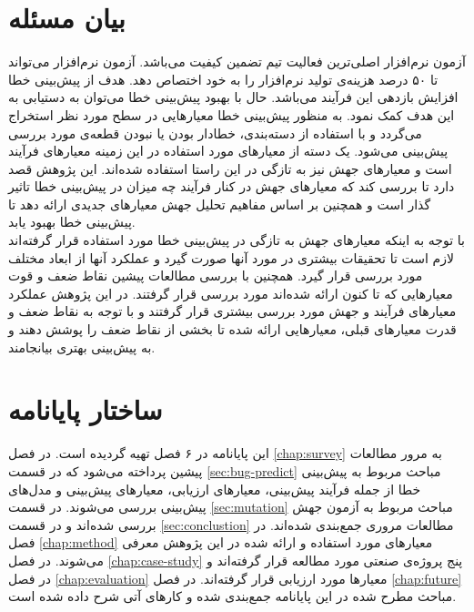 \section{بیان مسئله}
آزمون نرم‌افزار اصلی‌ترین فعالیت تیم  تضمین کیفیت می‌باشد. آزمون نرم‌افزار می‌تواند تا ۵۰ درصد هزینه‌ی تولید نرم‌افزار را به خود اختصاص دهد. هدف از پیش‌بینی خطا افزایش بازدهی این فرآیند می‌باشد. حال با بهبود پیش‌بینی خطا می‌توان به دستیابی به این هدف کمک نمود. به منظور پیش‌بینی خطا معیارهایی  در سطح مورد نظر استخراج می‌گردد و با استفاده از دسته‌بندی، خطادار بودن یا نبودن قطعه‌ی مورد بررسی پیش‌بینی می‌شود. یک دسته از معیارهای مورد استفاده در این زمینه معیارهای فرآیند است و معیارهای جهش نیز به تازگی در این راستا استفاده شده‌اند. این پژوهش قصد دارد تا بررسی کند که معیارهای جهش در کنار فرآیند  چه میزان در پیش‌بینی خطا تاثیر گذار است و همچنین بر اساس مفاهیم تحلیل جهش معیارهای جدیدی ارائه دهد تا پیش‌بینی خطا بهبود یابد. \\

با توجه به اینکه معیارهای جهش به تازگی در پیش‌بینی خطا مورد استفاده قرار گرفته‌اند لازم است تا تحقیقات بیشتری در مورد آنها صورت گیرد و عملکرد آنها از ابعاد مختلف مورد بررسی قرار گیرد. همچنین با بررسی مطالعات پیشین نقاط ضعف و قوت معیارهایی که تا کنون ارائه شده‌اند مورد بررسی قرار گرفتند. در این پژوهش عملکرد معیارهای فرآیند و جهش مورد بررسی بیشتری قرار گرفتند و با توجه به نقاط ضعف و قدرت معیارهای قبلی، معیارهایی ارائه شده تا بخشی از نقاط ضعف را پوشش دهند و به پیش‌بینی بهتری بیانجامند. 
\section{ساختار پایانامه}

این پایانامه در ۶ فصل تهیه گردیده است. در فصل \ref{chap:survey} به مرور مطالعات پیشین پرداخته می‌شود که در  قسمت \ref{sec:bug-predict}  مباحث مربوط به پیش‌بینی خطا از جمله فرآیند پیش‌بینی، معیارهای ارزیابی، معیارهای پیش‌بینی و مدل‌های پیش‌بینی بررسی می‌شوند. در قسمت \ref{sec:mutation} مباحث مربوط به آزمون جهش بررسی شده‌اند و در قسمت \ref{sec:conclustion} مطالعات مروری جمع‌بندی شده‌اند. در فصل \ref{chap:method} معیارهای مورد استفاده و ارائه شده در این پژوهش معرفی می‌شوند. در فصل \ref{chap:case-study} پنج پروژه‌ی صنعتی مورد مطالعه قرار گرفته‌اند و در فصل \ref{chap:evaluation} معیارها مورد ارزیابی قرار گرفته‌اند. در فصل \ref{chap:future} مباحث مطرح شده در این پایانامه جمع‌بندی شده و کارهای آتی شرح داده شده است. 
	
